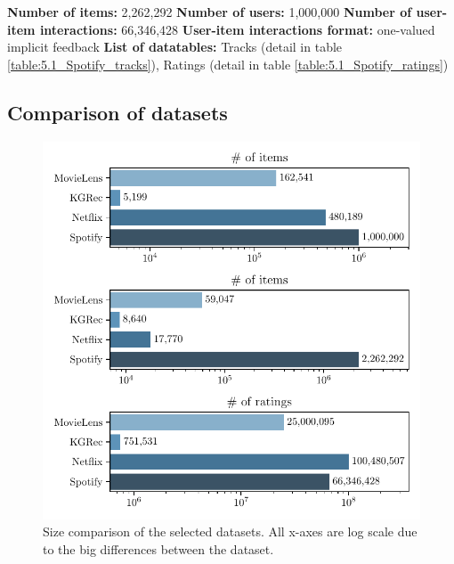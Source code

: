 \hfill \break
\noindent
\textbf{Number of items:} 2,262,292 \newline
\textbf{Number of users:} 1,000,000 \newline
\textbf{Number of user-item interactions:} 66,346,428 \newline
\textbf{User-item interactions format:} one-valued implicit feedback \newline
\textbf{List of datatables:} Tracks (detail in table \ref{table:5.1_Spotify_tracks}), Ratings (detail in table \ref{table:5.1_Spotify_ratings})




\subsection{Comparison of datasets}

\begin{figure}[ht!]
    \centering
    \includegraphics{img/figures/datasets_counts.pdf}
    \caption{Size comparison of the selected datasets. All x-axes are log scale due to the big differences between the dataset.}
    \label{fig:datasets_counts}
\end{figure}

